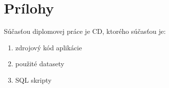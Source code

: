 \documentclass[slovak,master,public,dept460,male,cpdeclaration,oneside]{diploma}
\begin{document}
 



\section{Prílohy}

Súčasťou diplomovej práce je CD, ktorého súčasťou je:
\begin{enumerate}
\item zdrojový kód aplikácie
\item použité datasety
\item SQL skripty
\end{enumerate}
\end{document}
